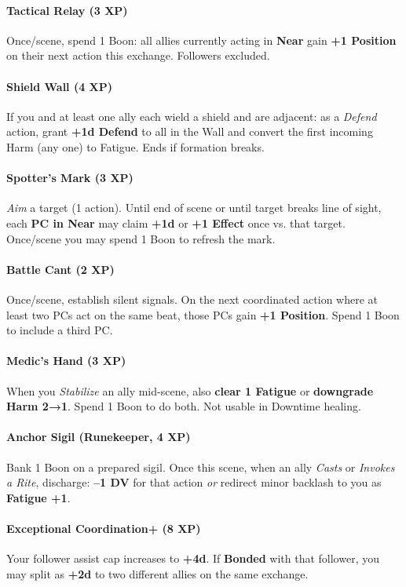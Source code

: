 \paragraph{Tactical Relay (3 XP)}
Once/scene, spend 1 Boon: all allies currently acting in \textbf{Near} gain \textbf{+1 Position} on their next action this exchange. Followers excluded.

\paragraph{Shield Wall (4 XP)}
If you and at least one ally each wield a shield and are adjacent: as a \emph{Defend} action, grant \textbf{+1d Defend} to all in the Wall and convert the first incoming Harm (any one) to Fatigue. Ends if formation breaks.

\paragraph{Spotter’s Mark (3 XP)}
\emph{Aim} a target (1 action). Until end of scene or until target breaks line of sight, each \textbf{PC in Near} may claim \textbf{+1d} or \textbf{+1 Effect} once vs. that target. Once/scene you may spend 1 Boon to refresh the mark.

\paragraph{Battle Cant (2 XP)}
Once/scene, establish silent signals. On the next coordinated action where at least two PCs act on the same beat, those PCs gain \textbf{+1 Position}. Spend 1 Boon to include a third PC.

\paragraph{Medic’s Hand (3 XP)}
When you \emph{Stabilize} an ally mid-scene, also \textbf{clear 1 Fatigue} or \textbf{downgrade Harm 2→1}. Spend 1 Boon to do both. Not usable in Downtime healing.

\paragraph{Anchor Sigil (Runekeeper, 4 XP)}
Bank 1 Boon on a prepared sigil. Once this scene, when an ally \emph{Casts} or \emph{Invokes a Rite}, discharge: \textbf{–1 DV} for that action \emph{or} redirect minor backlash to you as \textbf{Fatigue +1}.

\paragraph{Exceptional Coordination+ (8 XP)}
Your follower assist cap increases to \textbf{+4d}. If \textbf{Bonded} with that follower, you may split as \textbf{+2d} to two different allies on the same exchange.



